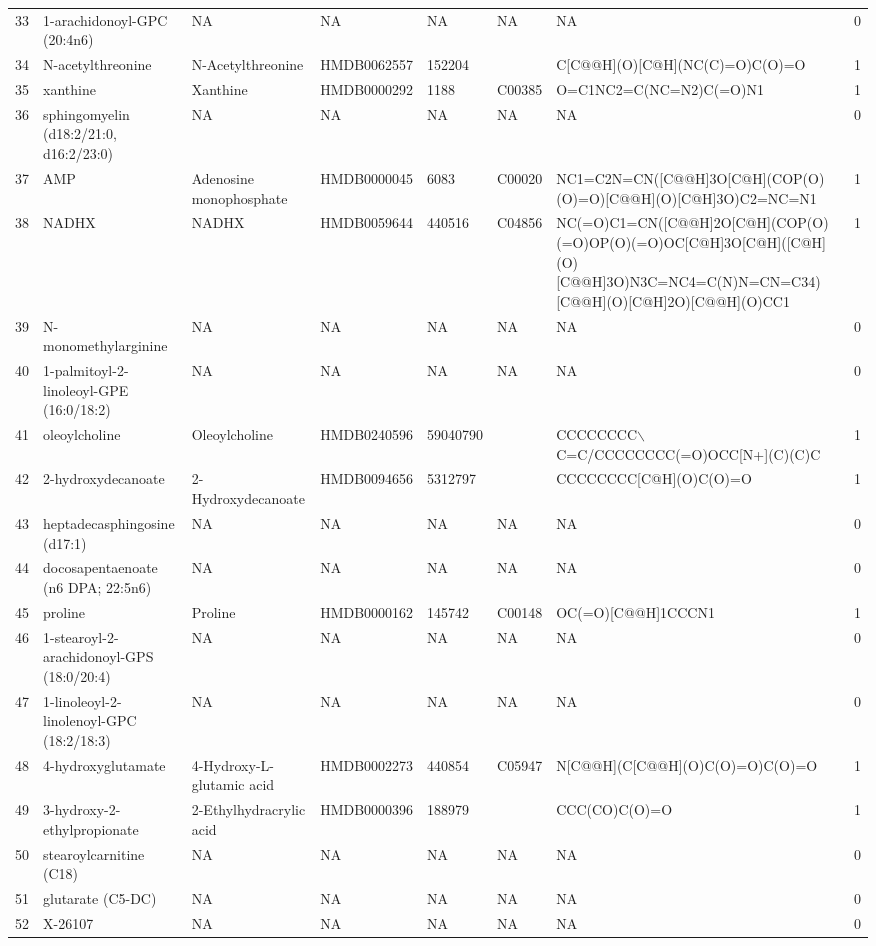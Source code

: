\documentclass[a4paper]{article}
\begin{document}
\begin{longtable}{rlllllll}
  33 & 1-arachidonoyl-GPC (20:4n6) & NA & NA & NA & NA & NA & 0 \\ 
  34 & N-acetylthreonine & N-Acetylthreonine & HMDB0062557 & 152204 &  & C[C@@H](O)[C@H](NC(C)=O)C(O)=O & 1 \\ 
  35 & xanthine & Xanthine & HMDB0000292 & 1188 & C00385 & O=C1NC2=C(NC=N2)C(=O)N1 & 1 \\ 
  36 & sphingomyelin (d18:2/21:0, d16:2/23:0) & NA & NA & NA & NA & NA & 0 \\ 
  37 & AMP & Adenosine monophosphate & HMDB0000045 & 6083 & C00020 & NC1=C2N=CN([C@@H]3O[C@H](COP(O)(O)=O)[C@@H](O)[C@H]3O)C2=NC=N1 & 1 \\ 
  38 & NADHX & NADHX & HMDB0059644 & 440516 & C04856 & NC(=O)C1=CN([C@@H]2O[C@H](COP(O)(=O)OP(O)(=O)OC[C@H]3O[C@H]([C@H](O)[C@@H]3O)N3C=NC4=C(N)N=CN=C34)[C@@H](O)[C@H]2O)[C@@H](O)CC1 & 1 \\ 
  39 & N-monomethylarginine & NA & NA & NA & NA & NA & 0 \\ 
  40 & 1-palmitoyl-2-linoleoyl-GPE (16:0/18:2) & NA & NA & NA & NA & NA & 0 \\ 
  41 & oleoylcholine & Oleoylcholine & HMDB0240596 & 59040790 &  & CCCCCCCC$\backslash$C=C/CCCCCCCC(=O)OCC[N+](C)(C)C & 1 \\ 
  42 & 2-hydroxydecanoate & 2-Hydroxydecanoate & HMDB0094656 & 5312797 &  & CCCCCCCC[C@H](O)C(O)=O & 1 \\ 
  43 & heptadecasphingosine (d17:1) & NA & NA & NA & NA & NA & 0 \\ 
  44 & docosapentaenoate (n6 DPA; 22:5n6) & NA & NA & NA & NA & NA & 0 \\ 
  45 & proline & Proline & HMDB0000162 & 145742 & C00148 & OC(=O)[C@@H]1CCCN1 & 1 \\ 
  46 & 1-stearoyl-2-arachidonoyl-GPS (18:0/20:4) & NA & NA & NA & NA & NA & 0 \\ 
  47 & 1-linoleoyl-2-linolenoyl-GPC (18:2/18:3) & NA & NA & NA & NA & NA & 0 \\ 
  48 & 4-hydroxyglutamate & 4-Hydroxy-L-glutamic acid & HMDB0002273 & 440854 & C05947 & N[C@@H](C[C@@H](O)C(O)=O)C(O)=O & 1 \\ 
  49 & 3-hydroxy-2-ethylpropionate & 2-Ethylhydracrylic acid & HMDB0000396 & 188979 &  & CCC(CO)C(O)=O & 1 \\ 
  50 & stearoylcarnitine (C18) & NA & NA & NA & NA & NA & 0 \\ 
  51 & glutarate (C5-DC) & NA & NA & NA & NA & NA & 0 \\ 
  52 & X-26107 & NA & NA & NA & NA & NA & 0 \\ 

\end{longtable}
\end{document}
